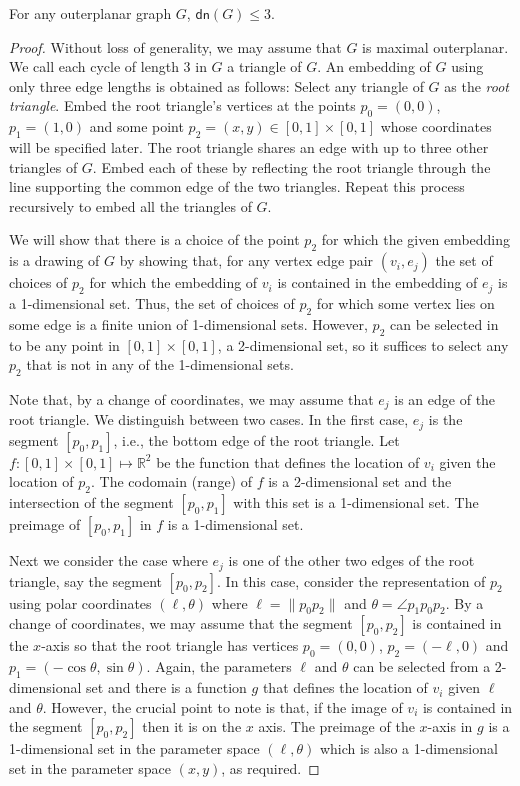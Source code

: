 \documentclass{article}
\newcommand{\dn}{\mathsf{dn}}
\begin{document}
\begin{thm}
For any outerplanar graph $G$, $\dn(G)\le 3$.
\end{thm}

\begin{proof}
Without loss of generality, we may assume that $G$ is maximal
outerplanar.  We call each cycle of length 3 in $G$ a triangle of $G$.
An embedding of $G$ using only three edge lengths is obtained as
follows:  Select any triangle of $G$ as the \emph{root triangle}.
Embed the root triangle's vertices at the points $p_0=(0,0)$,
$p_1=(1,0)$ and some point $p_2=(x,y)\in[0,1]\times[0,1]$ whose
coordinates will be specified later.  The root triangle shares an edge
with up to three other triangles of $G$.  Embed each of these by
reflecting the root triangle through the line supporting the common
edge of the two triangles.  Repeat this process recursively to embed
all the triangles of $G$.

We will show that there is a choice of the point $p_2$ for which the
given embedding is a drawing of $G$ by showing that, for any vertex
edge pair $(v_i,e_j)$ the set of choices of $p_2$ for which the
embedding of $v_i$ is contained in the embedding of $e_j$ is a
1-dimensional set.  Thus, the set of choices of $p_2$ for which some
vertex lies on some edge is a finite union of 1-dimensional sets.
However, $p_2$ can be selected in to be any point in
$[0,1]\times[0,1]$, a 2-dimensional set, so it suffices to select any
$p_2$ that is not in any of the 1-dimensional sets.

Note that, by a change of coordinates, we may assume that $e_j$ is an
edge of the root triangle.  We distinguish between two cases.  In the
first case, $e_j$ is the segment $[p_0,p_1]$, i.e., the bottom edge of
the root triangle.  Let $f:[0,1]\times[0,1]\mapsto \mathbb{R}^2$ be
the function that defines the location of $v_i$ given the location of
$p_2$.  The codomain (range) of $f$ is a 2-dimensional set and the
intersection of the segment $[p_0,p_1]$ with this set is a
1-dimensional set. The preimage of $[p_0,p_1]$ in $f$ is a
1-dimensional set. 

Next we consider the case where $e_j$ is one of the other two edges of
the root triangle, say the segment $[p_0,p_2]$.  In this case,
consider the representation of $p_2$ using polar coordinates
$(\ell,\theta)$ where $\ell=\|p_0p_2\|$ and $\theta=\angle p_1p_0p_2$.
By a change of coordinates, we may assume that the segment $[p_0,p_2]$
is contained in the $x$-axis so that the root triangle has vertices
$p_0=(0,0)$, $p_2=(-\ell,0)$ and $p_1=(-\cos\theta,\sin\theta)$.
Again, the parameters $\ell$ and $\theta$ can be selected from a
2-dimensional set and there is a function $g$ that defines the
location of $v_i$ given $\ell$ and $\theta$.  However, the crucial
point to note is that, if the image of $v_i$ is contained in the
segment $[p_0,p_2]$ then it is on the $x$ axis.  The preimage of the
$x$-axis in $g$ is a 1-dimensional set in the parameter space
$(\ell,\theta)$ which is also a 1-dimensional set in the parameter
space $(x,y)$, as required.
\end{proof}
\end{document}
